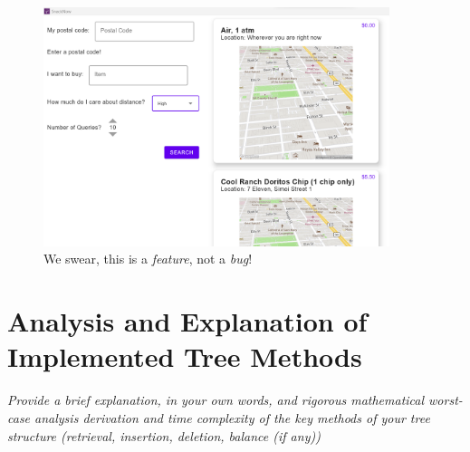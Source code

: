 \documentclass[12pt]{article}
\begin{document}
{\begin{figure}[ht]
    \centering
    \includegraphics[width=0.9\textwidth]{img/pa2appStartup.png}
    \caption{We swear, this is a \textit{feature}, not a \textit{bug}!}
    \label{fig:pa2limitations}
\end{figure}



\section{Analysis and Explanation of Implemented Tree Methods}

\textit{Provide a brief explanation, in your own words, and rigorous mathematical worst-case analysis derivation and time complexity of the key methods of your tree structure (retrieval, insertion, deletion, balance (if any))}

}
\end{document}
